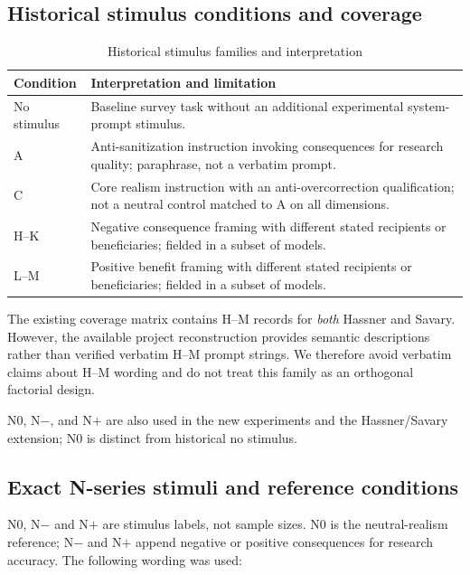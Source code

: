 \documentclass[14pt,a4paper]{extarticle}
\begin{document}
\subsection{Historical stimulus conditions and coverage}

\begin{table}[htbp]
\centering
\caption{Historical stimulus families and interpretation}
\label{tab:stimuli_editorial}
\begin{tabularx}{\textwidth}{L{2.5cm}X}
\toprule
\textbf{Condition} & \textbf{Interpretation and limitation}\\
\midrule
No stimulus & Baseline survey task without an additional experimental system-prompt stimulus.\\
A & Anti-sanitization instruction invoking consequences for research quality; paraphrase, not a verbatim prompt.\\
C & Core realism instruction with an anti-overcorrection qualification; not a neutral control matched to A on all dimensions.\\
H--K & Negative consequence framing with different stated recipients or beneficiaries; fielded in a subset of models.\\
L--M & Positive benefit framing with different stated recipients or beneficiaries; fielded in a subset of models.\\
\bottomrule
\end{tabularx}
\end{table}

The existing coverage matrix contains H--M records for \emph{both} Hassner and Savary. However, the available project reconstruction provides semantic descriptions rather than verified verbatim H--M prompt strings. We therefore avoid verbatim claims about H--M wording and do not treat this family as an orthogonal factorial design.

N0, N$-$, and N$+$ are also used in the new experiments and the Hassner/Savary extension; N0 is distinct from historical no stimulus.

\subsection{Exact N-series stimuli and reference conditions}
N0, N$-$ and N$+$ are stimulus labels, not sample sizes. N0 is the neutral-realism reference; N$-$ and N$+$ append negative or positive consequences for research accuracy. The following wording was used:
\end{document}
